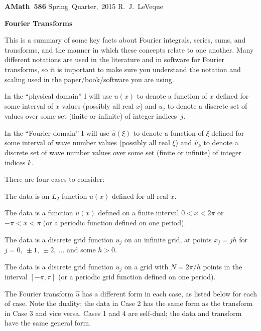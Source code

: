 \documentclass[11pt]{article}
\begin{document}
\hfill\vbox{\hbox{\bf AMath 586}
\hbox{Spring Quarter, 2015}
\hbox{R.\ J.\ LeVeque}}


\vskip 30pt
\centerline{\Large\bf Fourier Transforms}
\vskip 10pt



This is a summary of some key facts about Fourier integrals, series, 
sums, and transforms,
and the manner in which these concepts relate to one another.
Many different notations are used in the literature and in software for
Fourier transforms, so it is important to make sure you understand the
notation and scaling used in the paper/book/software you are using.


\vskip 5pt
In the ``physical domain''
I will use $u(x)$ to denote a function of $x$ defined for some interval
of $x$ values (possibly all real $x$) and $u_j$ to denote a discrete set of
values over some set (finite or infinite) of integer indices~$j$.

In the ``Fourier domain'' 
I will use $\hat u(\xi)$ to denote a function of $\xi$ defined for some interval
of wave number values (possibly all real $\xi$) 
and $\hat u_k$ to denote a discrete set of wave number 
values over some set (finite or infinite) of integer indices $k$.

\vskip 5pt
There are four cases to consider:
\begin{list}{{\bf Case .}}{
             \setlength{\leftmargin}{1.5cm}}
\item The data is an $L_2$ function $u(x)$ defined for all real $x$.
\item The data is a function $u(x)$ defined on a finite interval $0
< x < 2\pi$ or $-\pi < x < \pi$ (or a periodic function defined on one period).
\item The data is a discrete grid function $u_j$ on an infinite grid, at
points $x_j = jh$ for $j=0,~\pm 1,~\pm2,~\ldots$ and some $h>0$.
\item The data is a discrete grid function $u_j$ on a grid with $N= 2\pi / h$
points in the interval $[-\pi,\pi]$ (or a periodic grid function
defined on one period).
\end{list}

The Fourier transform $\hat u$ has a different form in each case, as listed
below for each of case.  Note the duality: the data in Case 2 has the same
form as the transform in Case 3 and vice versa.  Cases 1 and 4 are
self-dual; the data and transform have the same general form.
\end{document}
